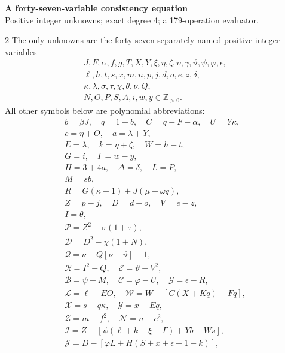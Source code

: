 \documentclass[10pt]{article}
\begin{document}
\begin{center}
{\large\bfseries A forty-seven-variable consistency equation}\\[-1pt]
{\small Positive integer unknowns; exact degree 4; a 179-operation evaluator.}
\end{center}\vspace{-8pt}
\begin{multicols}{2}
\fontsize{8.6}{9.1}\selectfont
The only unknowns are the forty-seven separately named positive-integer variables
\[
\begin{gathered}J,F,\alpha,f,g,T,X,Y,\xi,\eta,\zeta,\upsilon,\gamma,\vartheta,\psi,\varphi,\epsilon,\\
\ell,h,t,s,x,m,n,p,j,d,o,e,z,\delta,\\
\kappa,\lambda,\sigma,\tau,\chi,\theta,\nu,Q,\\
N,O,P,S,A,i,w,y\in\mathbb Z_{>0}.\end{gathered}
\]
All other symbols below are polynomial abbreviations:
\[
\begin{gathered}
b=\beta J,\quad q=1+b,\quad C=q-F-\alpha,\quad U=Y\kappa,\\
c=\eta+O,\quad a=\lambda+Y,\\
E=\lambda,\quad k=\eta+\zeta,\quad W=h-t,\\
G=i,\quad\Gamma=w-y,\\
H=3+4a,\quad\Delta=\delta,\quad L=P,\\
M=sb,\\
R=G(\kappa-1)+J(\mu+\omega q),\\
Z=p-j,\quad D=d-o,\quad V=e-z,\\
I=\theta,\\
\mathcal{P}=Z^2-\sigma(1+\tau),\\
\mathcal{D}=D^2-\chi(1+N),\\
\mathcal{Q}=\nu-Q[\nu-\vartheta]-1,\\
\mathcal{R}=I^2-Q,\quad \mathcal{E}=\vartheta-V^2,\\
\mathcal{B}=\psi-M,\quad \mathcal{C}=\varphi-U,\quad \mathcal{G}=\epsilon-R,\\
\mathcal{L}=\ell-EO,\quad \mathcal{W}=W-[C(X+Kq)-Fq],\\
\mathcal{X}=s-q\kappa,\quad \mathcal{Y}=x-Eq,\\
\mathcal{Z}=m-f^2,\quad \mathcal{N}=n-c^2,\\
\mathcal{I}=Z-[\psi(\ell+k+\xi-\Gamma)+Yb-Ws],\\
\mathcal{J}=D-[\varphi L+H(S+x+\epsilon+1-k)],\\

\end{gathered}\]
\end{multicols}
\end{document}
